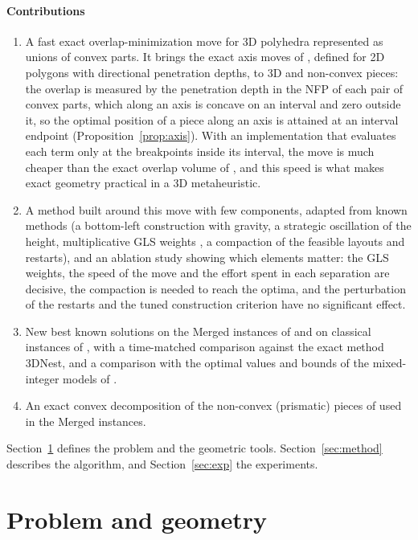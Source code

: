 \documentclass[preprint,12pt,authoryear]{elsarticle}
\begin{document}
\paragraph{Contributions}
\begin{enumerate}
\item A fast exact overlap-minimization move for 3D polyhedra represented as unions of convex parts. It brings
the exact axis moves of \citet{umetani2009}, defined for 2D polygons with directional penetration depths, to 3D
and non-convex pieces: the overlap is measured by the penetration depth in the NFP of each pair of convex parts,
which along an axis is concave on an interval and zero outside it, so the optimal position of a piece along an
axis is attained at an interval endpoint (Proposition~\ref{prop:axis}). With an implementation that evaluates
each term only at the breakpoints inside its interval, the move is much cheaper than the exact overlap volume of
\citet{egeblad2009}, and this speed is what makes exact geometry practical in a 3D metaheuristic.
\item A method built around this move with few components, adapted from known methods (a bottom-left
construction with gravity, a strategic oscillation of the height, multiplicative GLS weights \citep{gardeyn2025},
a compaction of the feasible layouts and restarts), and an ablation study showing which elements matter: the GLS weights, the
speed of the move and the effort spent in each separation are decisive, the compaction is needed to reach
the optima, and the perturbation of the restarts and the tuned construction criterion have no significant
effect.
\item New best known solutions on the Merged instances of \citet{egeblad2009} and on classical instances of
\citet{stoyan2004,stoyan2005}, with a time-matched comparison against the exact method 3DNest, and a comparison
with the optimal values and bounds of the mixed-integer models of \citet{tollenaere2026}.
\item An exact convex decomposition of the non-convex (prismatic) pieces of \citet{ikonen1997} used in the
Merged instances.
\end{enumerate}

Section~\ref{sec:problem} defines the problem and the geometric tools. Section~\ref{sec:method} describes the
algorithm, and Section~\ref{sec:exp} the experiments.

\section{Problem and geometry}\label{sec:problem}
\end{document}
